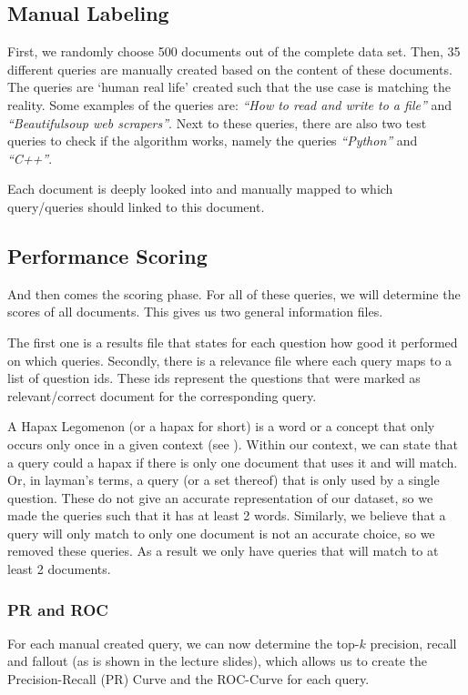\documentclass[11pt]{article}
\begin{document}
\subsection{Manual Labeling}
First, we randomly choose 500 documents out of the complete data set. Then, 35 different queries are manually created based on the content of these documents. The queries are `human real life' created such that the use case is matching the reality. Some examples of the queries are: \textit{``How to read and write to a file''} and \textit{``Beautifulsoup web scrapers''}. Next to these queries, there are also two test queries to check if the algorithm works, namely the queries \textit{``Python''} and \textit{``C++''}.

Each document is deeply looked into and manually mapped to which query/queries should linked to this document.

\subsection{Performance Scoring}
And then comes the scoring phase. For all of these queries, we will determine the scores of all documents. This gives us two general information files.

The first one is a results file that states for each question how good it performed on which queries. Secondly, there is a relevance file where each query maps to a list of question ids. These ids represent the questions that were marked as relevant/correct document for the corresponding query.

A \textsf{Hapax Legomenon} (or a \textsf{hapax} for short) is a word or a concept that only occurs only once in a given context (see \cite{hapax}). Within our context, we can state that a query could a \textsf{hapax} if there is only one document that uses it and will match. Or, in layman's terms, a query (or a set thereof) that is only used by a single question. These do not give an accurate representation of our dataset, so we made the queries such that it has at least 2 words. Similarly, we believe that a query will only match to only one document is not an accurate choice, so we removed these queries. As a result we only have queries that will match to at least 2 documents.

\subsubsection{PR and ROC}
For each manual created query, we can now determine the top-$k$ precision, recall and fallout (as is shown in the lecture slides), which allows us to create the Precision-Recall (PR) Curve and the ROC-Curve for each query.
\end{document}
